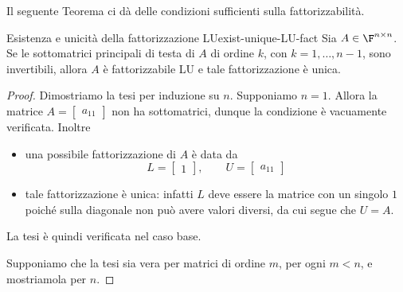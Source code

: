 Il seguente Teorema ci dà delle condizioni sufficienti sulla fattorizzabilità.

\begin{theorem}
    {Esistenza e unicità della fattorizzazione LU}{exist-unique-LU-fact}
    Sia $A \in \Mat{\F, n, n}$. Se le sottomatrici principali di testa di $A$ di ordine $k$, con $k = 1, \dots, n-1$, sono invertibili, allora $A$ è fattorizzabile LU e tale fattorizzazione è unica.  
\end{theorem}
\begin{proof}
    Dimostriamo la tesi per induzione su $n$.
     Supponiamo $n = 1$. Allora la matrice $A = \begin{bmatrix}
        a_{11}
    \end{bmatrix}$ non ha sottomatrici, dunque la condizione è vacuamente verificata. Inoltre \begin{itemize}
        \item una possibile fattorizzazione di $A$ è data da \[
            L = \begin{bmatrix} 1 \end{bmatrix}, \qquad
            U = \begin{bmatrix} a_{11} \end{bmatrix}
        \]
        \item tale fattorizzazione è unica: infatti $L$ deve essere la matrice con un singolo $1$ poiché sulla diagonale non può avere valori diversi, da cui segue che $U = A$.
    \end{itemize}
    La tesi è quindi verificata nel caso base.

     Supponiamo che la tesi sia vera per matrici di ordine $m$, per ogni $m < n$, e mostriamola per $n$.


\end{proof}
